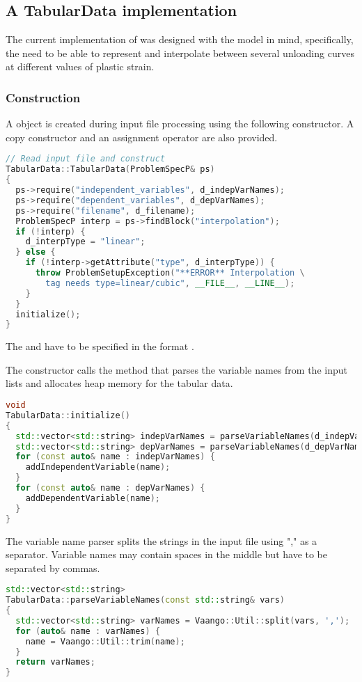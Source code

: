 \subsection{A TabularData implementation}
The current implementation of  was designed with the
 model in mind, specifically, the need to be able to
represent and interpolate between several unloading curves at different values
of plastic strain.

\subsubsection{Construction}
A  object is created during input file processing using
the following constructor.  A copy constructor and an assignment operator are
also provided.
\begin{lstlisting}[language=Cpp]
// Read input file and construct
TabularData::TabularData(ProblemSpecP& ps)
{
  ps->require("independent_variables", d_indepVarNames);
  ps->require("dependent_variables", d_depVarNames);
  ps->require("filename", d_filename);
  ProblemSpecP interp = ps->findBlock("interpolation");
  if (!interp) {
    d_interpType = "linear";
  } else {
    if (!interp->getAttribute("type", d_interpType)) {
      throw ProblemSetupException("**ERROR** Interpolation \
        tag needs type=linear/cubic", __FILE__, __LINE__);
    }
  }
  initialize();
}
\end{lstlisting}
The  and  have to
be specified in the format \Textsfc{var1, var2, var3}.  

The constructor calls the  method that parses
the variable names from the input lists and allocates heap memory for
the tabular data.
\begin{lstlisting}[language=Cpp]
void
TabularData::initialize()
{
  std::vector<std::string> indepVarNames = parseVariableNames(d_indepVarNames);
  std::vector<std::string> depVarNames = parseVariableNames(d_depVarNames);
  for (const auto& name : indepVarNames) {
    addIndependentVariable(name);
  }
  for (const auto& name : depVarNames) {
    addDependentVariable(name);
  }
}
\end{lstlisting}

The variable name parser splits the strings in the input file using "," as
a separator.  Variable names may contain spaces in the middle but have to
be separated by commas.
\begin{lstlisting}[language=Cpp]
std::vector<std::string>
TabularData::parseVariableNames(const std::string& vars)
{
  std::vector<std::string> varNames = Vaango::Util::split(vars, ',');
  for (auto& name : varNames) {
    name = Vaango::Util::trim(name);
  }
  return varNames;
}
\end{lstlisting}

